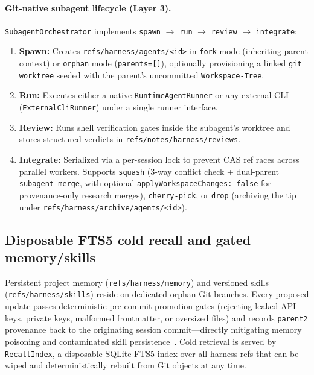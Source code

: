 \documentclass[11pt]{article}
\newcommand{\code}[1]{\nolinkurl{#1}}
\begin{document}
\paragraph{Git-native subagent lifecycle (Layer 3).}
\texttt{SubagentOrchestrator} implements \texttt{spawn} $\to$ \texttt{run} $\to$ \texttt{review} $\to$ \texttt{integrate}:
\begin{enumerate}[leftmargin=*,nosep]
  \item \textbf{Spawn:} Creates \code{refs/harness/agents/<id>} in \texttt{fork} mode (inheriting parent context) or \texttt{orphan} mode (\texttt{parents=[]}), optionally provisioning a linked \texttt{git worktree} seeded with the parent's uncommitted \texttt{Workspace-Tree}.
  \item \textbf{Run:} Executes either a native \texttt{RuntimeAgentRunner} or any external CLI (\texttt{ExternalCliRunner}) under a single runner interface.
  \item \textbf{Review:} Runs shell verification gates inside the subagent's worktree and stores structured verdicts in \code{refs/notes/harness/reviews}.
  \item \textbf{Integrate:} Serialized via a per-session lock to prevent CAS ref races across parallel workers. Supports \texttt{squash} (3-way conflict check + dual-parent \texttt{subagent-merge}, with optional \texttt{applyWorkspaceChanges: false} for provenance-only research merges), \texttt{cherry-pick}, or \texttt{drop} (archiving the tip under \code{refs/harness/archive/agents/<id>}).
\end{enumerate}

\subsection{Disposable FTS5 cold recall and gated memory/skills}
\label{sec:knowledge}
Persistent project memory (\code{refs/harness/memory}) and versioned skills (\code{refs/harness/skills}) reside on dedicated orphan Git branches.
Every proposed update passes deterministic pre-commit promotion gates (rejecting leaked API keys, private keys, malformed frontmatter, or oversized files) and records \texttt{parent2} provenance back to the originating session commit---directly mitigating memory poisoning and contaminated skill persistence~\citep{karten2026primeagent}.
Cold retrieval is served by \texttt{RecallIndex}, a disposable SQLite FTS5 index over all harness refs that can be wiped and deterministically rebuilt from Git objects at any time.
\end{document}
